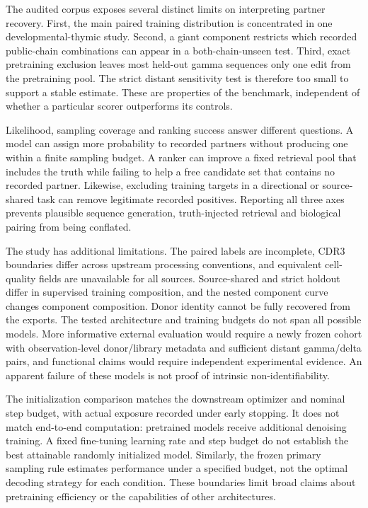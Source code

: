 \documentclass[10pt]{article}
\begin{document}
The audited corpus exposes several distinct limits on interpreting partner
recovery. First, the main paired training distribution is concentrated in one
developmental-thymic study. Second, a giant component restricts which recorded
public-chain combinations can appear in a both-chain-unseen test. Third, exact
pretraining exclusion leaves most held-out gamma sequences only one edit from
the pretraining pool. The strict distant sensitivity test is therefore too small
to support a stable estimate. These are properties of the benchmark, independent
of whether a particular scorer outperforms its controls.

Likelihood, sampling coverage and ranking success answer different questions.
A model can assign more probability to recorded partners without producing one
within a finite sampling budget. A ranker can improve a fixed retrieval pool
that includes the truth while failing to help a free candidate set that contains
no recorded partner. Likewise, excluding training targets in a directional or
source-shared task can remove legitimate recorded positives. Reporting all three
axes prevents plausible sequence generation, truth-injected retrieval and
biological pairing from being conflated.

The study has additional limitations. The paired labels are incomplete, CDR3
boundaries differ across upstream processing conventions, and equivalent
cell-quality fields are unavailable for all sources. Source-shared and strict
holdout differ in supervised training composition, and the nested component
curve changes component composition. Donor identity cannot be fully recovered
from the exports. The tested architecture and training budgets do not span all
possible models. More informative external evaluation would require a newly
frozen cohort with observation-level donor/library metadata and sufficient
distant gamma/delta pairs, and functional claims would require independent
experimental evidence. An apparent failure of these models is not proof of
intrinsic non-identifiability.

The initialization comparison matches the downstream optimizer and nominal
step budget, with actual exposure recorded under early stopping. It does not
match end-to-end computation: pretrained models receive additional denoising
training. A fixed fine-tuning learning rate and step budget do not
establish the best attainable randomly initialized model. Similarly, the frozen
primary sampling rule estimates performance under a specified budget, not the
optimal decoding strategy for each condition. These boundaries limit broad
claims about pretraining efficiency or the capabilities of other architectures.
\end{document}
